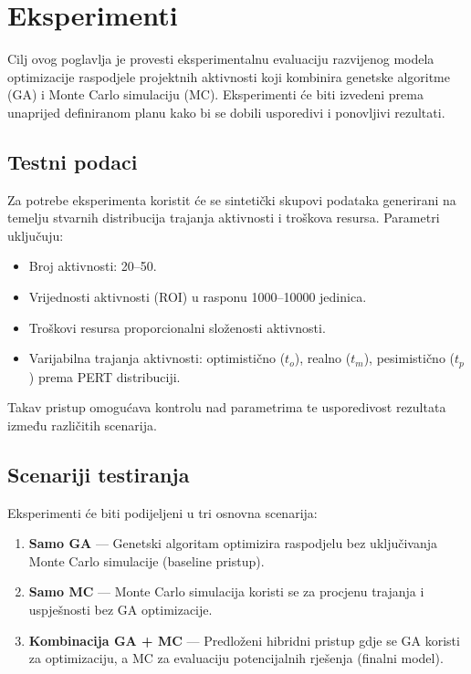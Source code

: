 \section{Eksperimenti}

Cilj ovog poglavlja je provesti eksperimentalnu evaluaciju razvijenog modela optimizacije raspodjele projektnih aktivnosti koji kombinira genetske algoritme (GA) i Monte Carlo simulaciju (MC).  
Eksperimenti će biti izvedeni prema unaprijed definiranom planu kako bi se dobili usporedivi i ponovljivi rezultati.

\subsection{Testni podaci}
Za potrebe eksperimenta koristit će se sintetički skupovi podataka generirani na temelju stvarnih distribucija trajanja aktivnosti i troškova resursa.  
Parametri uključuju:
\begin{itemize}
    \item Broj aktivnosti: 20--50.
    \item Vrijednosti aktivnosti (ROI) u rasponu 1000--10000 jedinica.
    \item Troškovi resursa proporcionalni složenosti aktivnosti.
    \item Varijabilna trajanja aktivnosti: optimistično ($t_o$), realno ($t_m$), pesimistično ($t_p$) prema PERT distribuciji.
\end{itemize}
Takav pristup omogućava kontrolu nad parametrima te usporedivost rezultata između različitih scenarija.

\subsection{Scenariji testiranja}
Eksperimenti će biti podijeljeni u tri osnovna scenarija:
\begin{enumerate}
    \item \textbf{Samo GA} — Genetski algoritam optimizira raspodjelu bez uključivanja Monte Carlo simulacije (baseline pristup).
    \item \textbf{Samo MC} — Monte Carlo simulacija koristi se za procjenu trajanja i uspješnosti bez GA optimizacije.
    \item \textbf{Kombinacija GA + MC} — Predloženi hibridni pristup gdje se GA koristi za optimizaciju, a MC za evaluaciju potencijalnih rješenja (finalni model).
\end{enumerate}

